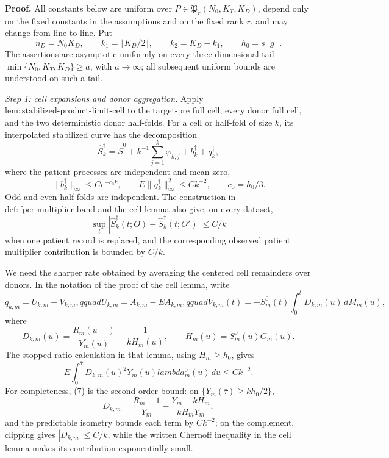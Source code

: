\textbf{Proof.}
All constants below are uniform over \(P\in\mathfrak P_r(N_0,K_T,K_D)\), depend only on the fixed constants in the assumptions and on the fixed rank \(r\), and may change from line to line.  Put
\[
 n_D=N_0K_D,\qquad k_1=\lfloor K_D/2\rfloor,
 \qquad k_2=K_D-k_1,
 \qquad h_0=s_-g_-.
\tag{1}
\]
The assertions are asymptotic uniformly on every three-dimensional tail
\(\min\{N_0,K_T,K_D\}\ge a\), with \(a\to\infty\); all subsequent uniform bounds are understood on such a tail.

\emph{Step 1: cell expansions and donor aggregation.}
Apply \(\mathrm{lem:stabilized\mbox{-}product\mbox{-}limit\mbox{-}cell}\) to the target-pre full cell, every donor full cell, and the two deterministic donor half-folds.  For a cell or half-fold of size \(k\), its interpolated stabilized curve has the decomposition
\[
 \widehat S_k^\dagger
 =\widetilde S^0+k^{-1}\sum_{j=1}^k\varphi_{k,j}
   +b_k^\dagger+q_k^\dagger,
\tag{2}
\]
where the patient processes are independent and mean zero,
\[
 \|b_k^\dagger\|_\infty\le Ce^{-c_0k},
 \qquad E\|q_k^\dagger\|_\infty^2\le Ck^{-2},
 \qquad c_0=h_0/3.
\tag{3}
\]
Odd and even half-folds are independent.  The construction in
\(\mathrm{def:fpcr\mbox{-}multiplier\mbox{-}band}\) and the cell lemma also give, on every dataset,
\[
 \sup_t|\widehat S_k^\dagger(t;O)-
              \widehat S_k^\dagger(t;O')|\le C/k
\tag{4}
\]
when one patient record is replaced, and the corresponding observed patient multiplier contribution is bounded by \(C/k\).

We need the sharper rate obtained by averaging the centered cell remainders over donors.  In the notation of the proof of the cell lemma, write
\[
 q_{k,m}^\dagger=U_{k,m}+V_{k,m},qquad
 U_{k,m}=A_{k,m}-EA_{k,m},qquad
 V_{k,m}(t)=-S^0_m(t)\int_0^tD_{k,m}(u)\,dM_m(u),
\tag{5}
\]
where
\[
 D_{k,m}(u)=\frac{R_m(u-)}{Y_m^\dagger(u)}
             -\frac{1}{kH_m(u)},
 \qquad H_m(u)=S_m^0(u)G_m(u).
\tag{6}
\]
The stopped ratio calculation in that lemma, using \(H_m\ge h_0\), gives
\[
 E\int_0^{\bar\tau}D_{k,m}(u)^2Y_m(u)lambda_m^0(u)\,du
 \le Ck^{-2}.
\tag{7}
\]
For completeness, (7) is the second-order bound: on
\(\{Y_m(\bar\tau)\ge kh_0/2\}\),
\[
 D_{k,m}=\frac{R_m-1}{Y_m}
 -\frac{Y_m-kH_m}{kH_mY_m},
\tag{8}
\]
and the predictable isometry bounds each term by \(Ck^{-2}\); on the complement, clipping gives \(|D_{k,m}|\le C/k\), while the written Chernoff inequality in the cell lemma makes its contribution exponentially small.

